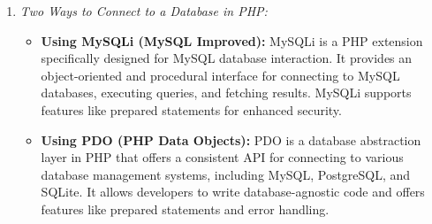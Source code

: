 \documentclass[11pt]{article}
\begin{document}
\begin{enumerate}
    \item \textit{Two Ways to Connect to a Database in PHP:}
    \begin{itemize}
        \item \textbf{Using MySQLi (MySQL Improved):} MySQLi is a PHP extension specifically designed for MySQL database interaction. It provides an object-oriented and procedural interface for connecting to MySQL databases, executing queries, and fetching results. MySQLi supports features like prepared statements for enhanced security.
        \item \textbf{Using PDO (PHP Data Objects):} PDO is a database abstraction layer in PHP that offers a consistent API for connecting to various database management systems, including MySQL, PostgreSQL, and SQLite. It allows developers to write database-agnostic code and offers features like prepared statements and error handling.
    \end{itemize}
\end{enumerate}
\end{document}
